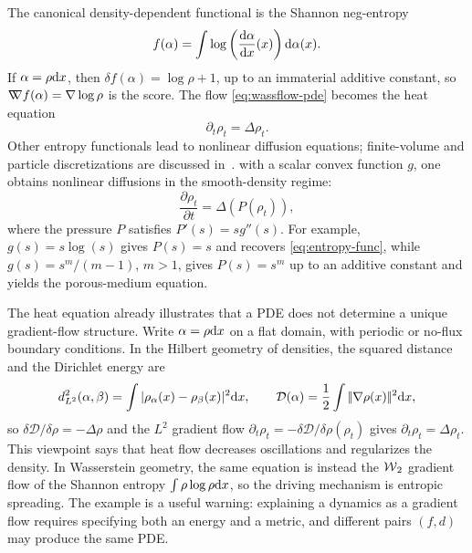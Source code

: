 \begin{example}
The canonical density-dependent functional is the Shannon neg-entropy
   \begin{equation}
       f(\alpha) = \int \log\left(\frac{\mathrm{d} \alpha}{\mathrm{d} x}(x)\right) \mathrm{d} \alpha(x). \label{eq:entropy-func}
   \end{equation}
	   If $\alpha=\rho\mathrm{d} x$, then $\delta f(\alpha) = \log\rho+1$, up to an immaterial additive constant, so $\mathord{\nabla\mkern-9.3mu\nabla} f(\alpha) = \nabla\log\rho$ is the score. The flow \eqref{eq:wassflow-pde} becomes the heat equation
   \begin{equation*}
	       \partial_t \rho_t = \Delta \rho_t.
   \end{equation*}
   Other entropy functionals lead to nonlinear diffusion equations; finite-volume and particle discretizations are discussed in~\cite{CarrilloFiniteVolume,GianazzaARMA,Maas2011,ErbarHeatManifold}.
%
	   with a scalar convex function $g$, one obtains nonlinear diffusions in the smooth-density regime:
   \begin{equation*}
	       \frac{\partial \rho_t}{\partial t} = \Delta(P(\rho_t)),
   \end{equation*}
   where the pressure $P$ satisfies $P'(s)=s g''(s)$. For example, $g(s) = s \log(s)$ gives $P(s)=s$ and recovers \eqref{eq:entropy-func}, while $g(s) = s^m/(m-1)$, $m > 1$, gives $P(s)=s^m$ up to an additive constant and yields the porous-medium equation.
\end{example}

\begin{rem}\label{rem-two-interpretations-heat-equation}
	The heat equation already illustrates that a PDE does not determine a unique gradient-flow structure. Write $\alpha=\rho\mathrm{d} x$ on a flat domain, with periodic or no-flux boundary conditions. In the Hilbert geometry of densities, the squared distance and the Dirichlet energy are
	\[
		d_{L^2}^2(\alpha,\beta)=\int |\rho_\alpha(x)-\rho_\beta(x)|^2\mathrm{d} x,
		\qquad
		\mathcal D(\alpha)=\frac12\int |\!| \nabla\rho(x) |\!|^2\mathrm{d} x,
	\]
	so $\delta\mathcal D/\delta\rho=-\Delta\rho$ and the $L^2$ gradient flow $\partial_t\rho_t=-\delta\mathcal D/\delta\rho(\rho_t)$ gives $\partial_t\rho_t=\Delta\rho_t$. This viewpoint says that heat flow decreases oscillations and regularizes the density. In Wasserstein geometry, the same equation is instead the $\operatorname{\mathcal{W}}_2$ gradient flow of the Shannon entropy $\int \rho\log\rho\mathrm{d} x$, so the driving mechanism is entropic spreading. The example is a useful warning: explaining a dynamics as a gradient flow requires specifying both an energy and a metric, and different pairs $(f,d)$ may produce the same PDE.
\end{rem}

